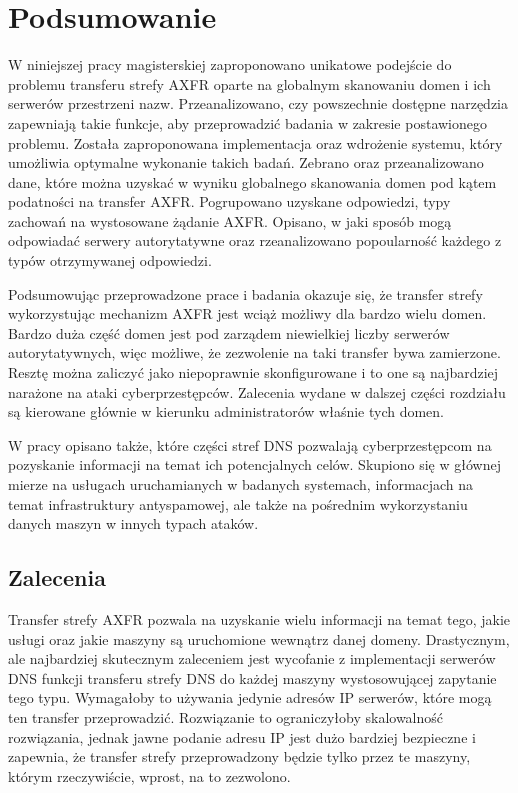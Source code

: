 \chapter{Podsumowanie}
\noindent W niniejszej pracy magisterskiej zaproponowano unikatowe podejście do problemu transferu strefy AXFR oparte na globalnym skanowaniu
domen i ich serwerów przestrzeni nazw. Przeanalizowano, czy powszechnie dostępne narzędzia zapewniają takie funkcje, aby przeprowadzić
badania w zakresie postawionego problemu. Została zaproponowana implementacja oraz wdrożenie systemu, który umożliwia optymalne wykonanie
takich badań. Zebrano oraz przeanalizowano dane, które można uzyskać w wyniku globalnego skanowania domen pod kątem podatności
na transfer AXFR. Pogrupowano uzyskane odpowiedzi, typy zachowań na wystosowane żądanie AXFR. Opisano, w jaki sposób mogą odpowiadać
serwery autorytatywne oraz rzeanalizowano popoularność każdego z typów otrzymywanej odpowiedzi.

Podsumowując przeprowadzone prace i badania okazuje się, że transfer strefy wykorzystując mechanizm AXFR jest wciąż możliwy dla
bardzo wielu domen. Bardzo duża część domen jest pod zarządem niewielkiej liczby serwerów autorytatywnych, więc możliwe, że zezwolenie
na taki transfer bywa zamierzone. Resztę można zaliczyć jako niepoprawnie skonfigurowane i to one są najbardziej narażone na
ataki cyberprzestępców. Zalecenia wydane w dalszej części rozdziału są kierowane głównie w kierunku administratorów właśnie tych domen.

W pracy opisano także, które części stref DNS pozwalają cyberprzestępcom na pozyskanie informacji na temat ich potencjalnych celów.
Skupiono się w głównej mierze na usługach uruchamianych w badanych systemach, informacjach na temat infrastruktury antyspamowej,
ale także na pośrednim wykorzystaniu danych maszyn w innych typach ataków.

\section{Zalecenia}
\noindent Transfer strefy AXFR pozwala na uzyskanie wielu informacji na temat tego, jakie usługi oraz jakie maszyny są uruchomione wewnątrz danej
domeny. Drastycznym, ale najbardziej skutecznym zaleceniem jest wycofanie z implementacji serwerów DNS funkcji transferu strefy DNS do
każdej maszyny wystosowującej zapytanie tego typu. Wymagałoby to używania jedynie adresów IP serwerów, które mogą ten transfer przeprowadzić.
Rozwiązanie to ograniczyłoby skalowalność rozwiązania, jednak jawne podanie adresu IP jest dużo bardziej bezpieczne i zapewnia, że
transfer strefy przeprowadzony będzie tylko przez te maszyny, którym rzeczywiście, wprost, na to zezwolono.

